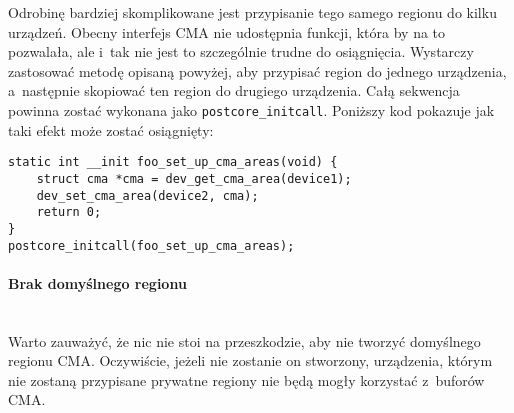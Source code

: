 Odrobinę bardziej skomplikowane jest przypisanie tego samego regionu
do kilku urządzeń.  Obecny interfejs CMA nie udostępnia funkcji, która
by na to pozwalała, ale i~tak nie jest to szczególnie trudne do
osiągnięcia.  Wystarczy zastosować metodę opisaną powyżej, aby
przypisać region do jednego urządzenia, a~następnie skopiować ten
region do drugiego urządzenia.  Całą sekwencja powinna zostać wykonana
jako \lstinline|postcore_initcall|.  Poniższy kod pokazuje jak taki
efekt może zostać osiągnięty:

\begin{lstlisting}
static int __init foo_set_up_cma_areas(void) {
	struct cma *cma = dev_get_cma_area(device1);
	dev_set_cma_area(device2, cma);
	return 0;
}
postcore_initcall(foo_set_up_cma_areas);
\end{lstlisting}

\paragraph{Brak domyślnego regionu} \hspace{0pt} \\

Warto zauważyć, że nic nie stoi na przeszkodzie, aby nie tworzyć
domyślnego regionu CMA.  Oczywiście, jeżeli nie zostanie on stworzony,
urządzenia, którym nie zostaną przypisane prywatne regiony nie będą
mogły korzystać z~buforów CMA.

